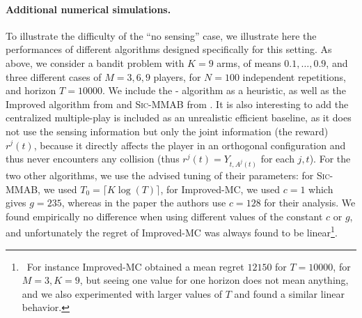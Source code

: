 \paragraph{Additional numerical simulations.}

To illustrate the difficulty of the ``no sensing'' case, we illustrate here the performances of different algorithms designed specifically for this setting.
As above, we consider a bandit problem with $K=9$ arms, of means $0.1,\dots,0.9$, and three different cases of $M=3,6,9$ players, for $N=100$ independent repetitions, and horizon $T=10000$.
We include the \Selfish-\klUCB{} algorithm as a heuristic, as well as the Improved \MusicalChair{} algorithm from \cite{LugosiMehrabian18} and \textsc{Sic-MMAB} from \cite{BoursierPerchet18}.
It is also interesting to add the centralized multiple-play \klUCB{} is included as an unrealistic efficient baseline, as it does not use the sensing information but only the joint information (the reward) $r^j(t)$, because it directly affects the player in an orthogonal configuration and thus never encounters any collision (thus $r^j(t)=Y_{t,A^j(t)}$ for each $j,t$).
%
For the two other algorithms, we use the advised tuning of their parameters:
for \textsc{Sic-MMAB}, we used $T_0 = \lceil K \log(T) \rceil$,
for Improved-MC, we used $c=1$ which gives $g=235$, whereas in the paper the authors use $c=128$ for their analysis.
We found empirically no difference when using different values of the constant $c$ or $g$, and unfortunately the regret of Improved-MC was always found to be linear\footnote{~For instance Improved-MC obtained a mean regret $12150$ for $T=10000$, for $M=3,K=9$, but seeing one value for one horizon does not mean anything, and we also experimented with larger values of $T$ and found a similar linear behavior.}.


